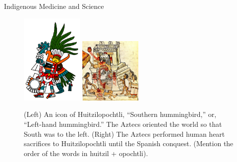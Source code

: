 \documentclass{beamer}
\begin{document}
\begin{frame}{Indigenous Medicine and Science}
\begin{figure}
\includegraphics[width=3cm]{figures/aztec4.png} \hspace{1cm}
\includegraphics[width=3cm]{figures/sacrifice.jpg}
\caption{(Left) An icon of Huitzilopochtli, ``Southern hummingbird,'' or, ``Left-hand hummingbird.'' The Aztecs oriented the world so that South was to the left.  (Right) The Aztecs performed human heart sacrifices to Huitzilopochtli until the Spanish conquest.  (Mention the order of the words in huitzil + opochtli).}
\end{figure}
\end{frame}
\end{document}
